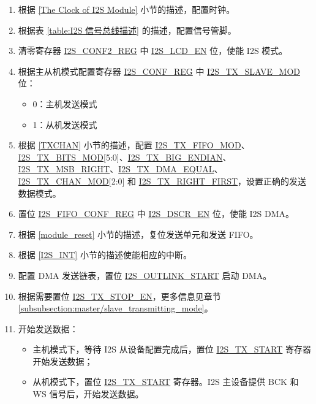 \documentclass[main\_\_CN.tex]{subfiles}
\begin{document}
\begin{enumerate}
    \item 根据 \ref{The Clock of I2S Module} 小节的描述，配置时钟。

    \item 根据表 \ref{table:I2S 信号总线描述} 的描述，配置信号管脚。

    \item 清零寄存器 \hyperref[regdesc:I2SCONF2REG]{I2S\_CONF2\_REG} 中 \hyperref[fielddesc:I2SLCDEN]{I2S\_LCD\_EN} 位，使能 I2S 模式。

    \item 根据主从机模式配置寄存器 \hyperref[regdesc:I2SCONFREG]{I2S\_CONF\_REG} 中 \hyperref[fielddesc:I2STXSLAVEMOD]{I2S\_TX\_SLAVE\_MOD} 位：
    \begin{itemize}
        \item 0：主机发送模式
        \item 1：从机发送模式
    \end{itemize}

    \item 根据 \ref{TXCHAN} 小节的描述，配置 \hyperref[fielddesc:I2STXFIFOMOD]{I2S\_TX\_FIFO\_MOD}、\hyperref[fielddesc:I2STXBITSMOD]{I2S\_TX\_BITS\_MOD}[5:0]、\hyperref[fielddesc:I2STXBIGENDIAN]{I2S\_TX\_BIG\_ENDIAN}、\hyperref[fielddesc:I2STXMSBRIGHT]{I2S\_TX\_MSB\_RIGHT}、\hyperref[fielddesc:I2STXDMAEQUAL]{I2S\_TX\_DMA\_EQUAL}、\hyperref[fielddesc:I2STXCHANMOD]{I2S\_TX\_CHAN\_MOD}[2:0] 和 \hyperref[fielddesc:I2STXRIGHTFIRST]{I2S\_TX\_RIGHT\_FIRST}，设置正确的发送数据模式。

    \item 置位 \hyperref[regdesc:I2SFIFOCONFREG]{I2S\_FIFO\_CONF\_REG} 中 \hyperref[fielddesc:I2SDSCREN]{I2S\_DSCR\_EN} 位，使能 I2S DMA。

    \item 根据 \ref{module_reset} 小节的描述，复位发送单元和发送 FIFO。
    \item 根据 \ref{I2S_INT} 小节的描述使能相应的中断。\label{I2S-TX-INTERRUPT}

    \item 配置 DMA 发送链表，置位 \hyperref[fielddesc:I2SOUTLINKSTART]{I2S\_OUTLINK\_START} 启动 DMA。

    \item 根据需要置位 \hyperref[fielddesc:I2STXSTOPEN]{I2S\_TX\_STOP\_EN}，更多信息见章节 \ref{subsubsection:master/slave_transmitting_mode}。

    \item 开始发送数据：
    \begin{itemize}
        \item 主机模式下，等待 I2S 从设备配置完成后，置位 \hyperref[fielddesc:I2STXSTART]{I2S\_TX\_START} 寄存器开始发送数据；
        \item 从机模式下，置位 \hyperref[fielddesc:I2STXSTART]{I2S\_TX\_START} 寄存器。I2S 主设备提供 BCK 和 WS 信号后，开始发送数据。
    \end{itemize}


\end{enumerate}
\end{document}
